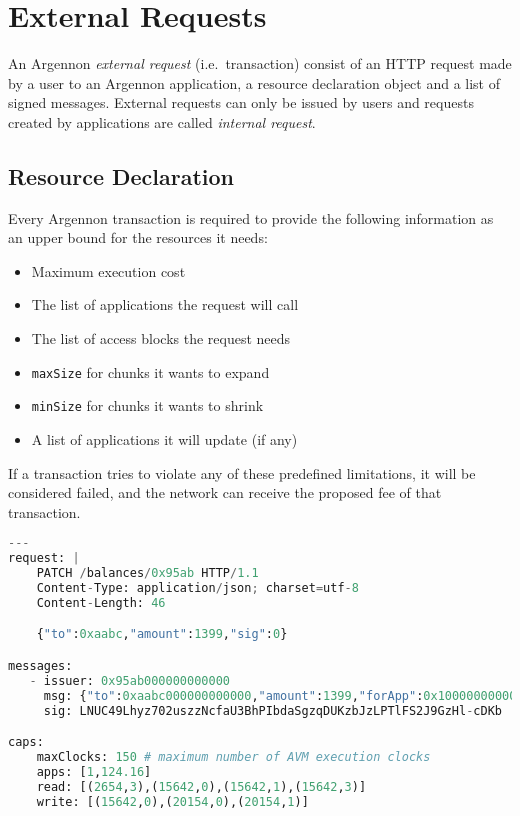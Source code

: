

\section{External Requests}\label{sec:transactions}

An Argennon \emph{external request} (i.e.\ transaction) consist of an HTTP request made by a user to an Argennon application, a
resource declaration object and a list of signed messages. External requests can only be
issued by users and requests created by applications are called \emph{internal request}.

\subsection{Resource Declaration}\label{subsec:resource-declaration}

Every Argennon transaction is required to provide the following information as an upper bound for the
resources it needs:

\begin{itemize}
    \item Maximum execution cost
    \item The list of applications the request will call
    \item The list of access blocks the request needs
    \item \texttt{maxSize} for chunks it wants to expand
    \item \texttt{minSize} for chunks it wants to shrink
    \item A list of applications it will update (if any)
\end{itemize}

If a transaction tries to violate any of these predefined limitations, it will be considered failed, and the network
can receive the proposed fee of that transaction.

\begin{lstlisting}[language=python, frame=TB, float, title=An Argennon transaction in YAML format,
    label={lst:txn-example}]
---
request: |
    PATCH /balances/0x95ab HTTP/1.1
    Content-Type: application/json; charset=utf-8
    Content-Length: 46

    {"to":0xaabc,"amount":1399,"sig":0}

messages:
   - issuer: 0x95ab000000000000
     msg: {"to":0xaabc000000000000,"amount":1399,"forApp":0x100000000000000,"nonce":11}
     sig: LNUC49Lhyz702uszzNcfaU3BhPIbdaSgzqDUKzbJzLPTlFS2J9GzHl-cDKb

caps:
    maxClocks: 150 # maximum number of AVM execution clocks
    apps: [1,124.16]
    read: [(2654,3),(15642,0),(15642,1),(15642,3)]
    write: [(15642,0),(20154,0),(20154,1)]
\end{lstlisting}


